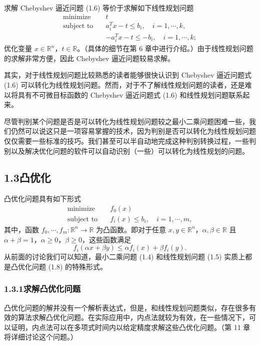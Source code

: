 \documentclass[UTF8, 12pt, fontset=fandol, oneside]{ctexart}
\begin{document}
求解 Chebyshev 逼近问题 (1.6) 等价于求解如下线性规划问题
\begin{equation}
\begin{aligned}
  \text{minimize}\quad & t\\
  \text{subject to}\quad & a_i^Tx-t\le b_i,\quad i=1,\cdots,k,\\
  & -a_i^Tx-t\le -b_i,\quad i=1,\cdots,k;
\end{aligned}
\tag{1.7}
\end{equation}
优化变量 $x\in\mathbb{R}^n$，$t\in\mathbb{R}$。（具体的细节在第 6 章中进行介绍。）由于线性规划问题的求解非常方便，因此 Chebyshev 逼近问题较易求解。

其实，对于线性规划问题比较熟悉的读者能够很快认识到 Chebyshev 逼近问题式 (1.6) 可以转化为线性规划问题。然而，对于不了解线性规划问题的读者，还是难以将具有不可微目标函数的 Chebyshev 逼近问题式 (1.6) 和线性规划问题联系起来。

尽管判别某个问题是否是可以转化为线性规划问题较之最小二乘问题困难一些，我们仍然可以说这只是一项容易掌握的技术，因为判别是否可以转化为线性规划问题仅仅需要一些标准的技巧。我们甚至可以半自动地完成这种判别转换过程，一些判别以及解决优化问题的软件可以自动识别（一些）可以转化为线性规划的问题。

\subsection*{1.3\quad 凸优化}

凸优化问题具有如下形式
\begin{equation}
\begin{aligned}
  \text{minimize}\quad & f_0(x)\\
  \text{subject to}\quad & f_i(x)\le b_i,\quad i=1,\cdots,m,
\end{aligned}
\tag{1.8}
\end{equation}
其中，函数 $f_0,\cdots,f_m:\mathbb{R}^n\to\mathbb{R}$ 为凸函数。即对于任意 $x,y\in\mathbb{R}^n$，$\alpha,\beta\in\mathbb{R}$ 且 $\alpha+\beta=1$，$\alpha\ge0$，$\beta\ge0$，这些函数满足
\[
  f_i(\alpha x+\beta y)\le \alpha f_i(x)+\beta f_i(y).
\]
从前面的讨论我们可以知道，最小二乘问题 (1.4) 和线性规划问题 (1.5) 实质上都是凸优化问题 (1.8) 的特殊形式。

\subsubsection*{1.3.1\quad 求解凸优化问题}

凸优化问题的解并没有一个解析表达式，但是，和线性规划问题类似，存在很多有效的算法求解凸优化问题。在实际应用中，内点法就较为有效，在一些情况下，可以证明，内点法可以在多项式时间内以给定精度求解这些凸优化问题。（第 11 章将详细讨论这个问题。）
\end{document}
